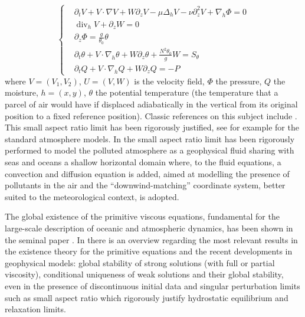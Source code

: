 \documentclass[11pt, a4paper, article,reqno,]{amsart}
\theoremstyle{remark}
\DeclareMathOperator{\dive}{div}
\numberwithin{equation}{section}
\begin{document}
\begin{equation}\label{prim_intro}
	\left\{\begin{aligned}
		& \partial_t V + V \cdot \nabla V + W\partial_z V - \mu \Delta_h V - \nu \partial_z^2 V + \nabla_h \Phi =0\\
  & \dive_h V + \partial_z W = 0 \\
		&  \partial_z \Phi = \frac{g}{\theta_0}\theta \\
	&\partial_t \theta + V \cdot \nabla_h \theta + W \partial_z \theta + \frac{N^2\theta_0}{g}W = S_{\theta} \\
 &\partial_t Q + V \cdot \nabla_h Q + W \partial_z Q = - P 
		\end{aligned}\right.
\end{equation}
where $V=(V_1,V_2)$, $U=(V,W)$ is the velocity field, $\Phi$ the pressure, $Q$ the moisture, $h=(x,y)$, $\theta$ the potential temperature (the temperature that a parcel of air would have if displaced adiabatically in the vertical from its original position to a fixed reference position). Classic references on this subject include \cite{LTW,LTW2,P,R,salmon,TZ}.
 This small aspect ratio limit has been rigorously justified, see for example  \cite{AG01,  LT19} for the standard atmosphere models. In  \cite{DJ, DJ2} the small aspect ratio limit has been rigorously performed to model  the polluted atmosphere as a geophysical fluid sharing with seas and oceans a shallow horizontal domain where,  to the fluid equations,  a convection and diffusion equation is added, aimed at modelling the presence of pollutants in the air and  the ``downwind-matching'' coordinate system,  better suited to the meteorological context, is adopted.

The global existence of the primitive viscous equations, fundamental for the large-scale description of oceanic and atmospheric dynamics, has been shown in the seminal paper \cite{CT}. In \cite{LT_chap} there is an overview regarding the most relevant results in the existence theory for the primitive equations and the recent developments in geophysical models:  global stability of strong solutions (with full or partial viscosity),  conditional uniqueness of weak solutions and their global stability, even in the presence of discontinuous initial data and  singular perturbation limits such as small aspect ratio which rigorously justify hydrostatic equilibrium  and relaxation limits. 
\end{document}
